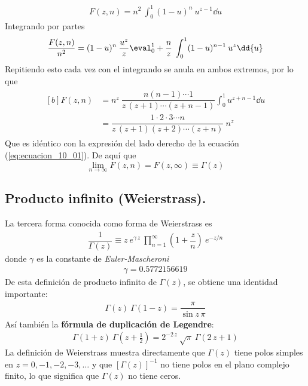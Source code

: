 \begin{align}
F(z,n) = n^{2} \: \int_{0}^{1} (1-u)^{n} \: u^{z-1} \dd{u}
\label{eq:ecuacion_10_12}
\end{align}
Integrando por partes
\begin{align}
\dfrac{F(z, n)}{n^{2}} =  (1-u)^{n} \: \dfrac{u^{z}}{z} \eval_{0}^{1} + \dfrac{n}{z} \: \int_{0}^{1} (1-u)^{n-1} \: u^{z} \dd{u}
\label{eq:ecuacion_10_13}
\end{align}
Repitiendo esto cada vez con el integrando se anula en ambos extremos, por lo que
\begin{align}
\begin{aligned}[b]
F(z,n) &= n^{z} \: \dfrac{n(n-1) \cdots 1}{z \, (z+1) \cdots (z+n-1)} \int_{0}^{1} u^{z+n-1} \dd{u} \\[0.5em]
&= \dfrac{1 \cdot 2 \cdot 3 \cdots n}{z \, (z+1)(z+2) \cdots (z+n)} \: n^{z}
\label{eq:ecuacion_10_14}
\end{aligned}
\end{align}
Que es idéntico con la expresión del lado derecho de la ecuación (\ref{eq:ecuacion_10_01}). De aquí que
\begin{equation}
\lim_{n \to \infty} F(z, n) = F(z, \infty) \equiv \Gamma (z)
\label{eq:ecuacion_10_15}
\end{equation}

\subsection{Producto infinito (Weierstrass).}

La tercera forma conocida como forma de Weierstrass es
\begin{align}
\dfrac{1}{\Gamma (z)} \equiv z \:  e^{\gamma \, z} \: \prod_{n=1}^{\infty} \left( 1 + \dfrac{z}{n} \right) \: e^{-z/n}
\label{eq:ecuacion_10_16}
\end{align}
donde $\gamma$ es la constante de \emph{Euler-Mascheroni}
\begin{align}
\gamma = 0.5772156619
\label{eq:ecuacion_10_17}
\end{align}
De esta definición de producto infinito de $\Gamma (z)$, se obtiene una identidad importante:
\begin{align}
\Gamma (z) \: \Gamma (1 - z) = \dfrac{\pi}{\sin z \, \pi}
\label{eq:ecuacion_10_23}
\end{align}
Así también la \textbf{fórmula de duplicación de Legendre}:
\begin{align}
\Gamma (1 + z) \: \Gamma (z + \frac{1}{2}) = 2^{-2 \, z} \: \sqrt{\pi} \: \Gamma (2 \, z + 1)
\label{eq:ecuacion_10_24b}
\end{align}
La definición de Weierstrass muestra directamente que $\Gamma (z)$ tiene polos simples en $z = 0, -1, -2, -3, \ldots$ y que $[\Gamma (z)]^{-1}$ no tiene polos en el plano complejo finito, lo que significa que $\Gamma (z)$ no tiene ceros.

